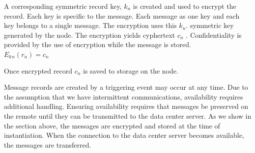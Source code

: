 A corresponding symmetric record key, $k{_n}$ is created and used to encrypt the record. Each key is specific to the message. Each message as one key and each key belongs to a single message. The encryption uses this $k{_n}$.  symmetric key generated by the node.  The encryption yields cyphertext $c{_n}$ .  
Confidentiality is provided by the use of encryption while the message is stored. \\
$E{_k{_n}}(r{_n}) = c{_n}$ 

Once encrypted record $c{_n}$ is saved to storage on the node.  

Message records are created by a triggering event may occur at any time. Due to the assumption that we have intermittent communications, availability requires additional handling. Ensuring availability requires that messages be preserved on the remote until they can be transmitted to the data center server. As we show in the section above, the messages are encrypted and stored at the time of instantiation.  When the connection to the data center server becomes available, the messages are transferred. 
